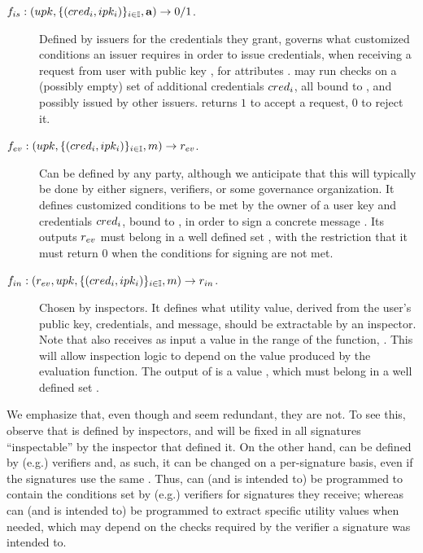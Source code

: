 \begin{description}
\item[$f_{is}: (upk,\lbrace (cred_i,ipk_i) \rbrace_{i \in \mathbb{I}},\mathbf{a})
  \rightarrow 0/1$.] Defined by issuers for the credentials they grant,
  governs what customized conditions an issuer requires in order to issue
  credentials, when receiving a request from user with public key \upk, for
  attributes \attrs. \fissue may run checks on a (possibly empty) set of
  additional credentials $cred_i$, all bound to \upk, and possibly issued
  by other issuers. \fissue returns $1$ to accept a request, $0$ to reject it.  
\item[$f_{ev}: (upk,\lbrace (cred_i,ipk_i) \rbrace_{i \in \mathbb{I}},m)
  \rightarrow r_{ev}$.] Can be defined by
  any party, although we anticipate that this will typically be done by either
  signers, verifiers, or some governance organization. It defines customized
  conditions to be met by the owner of a user key \upk and credentials $cred_i$,
  bound to \upk, in order to sign a concrete message \msg. Its outputs
  $r_{ev}$ must belong in a well defined set \rngfeval, with the
  restriction that it must return $0$ when the conditions for signing are not
  met.
\item[$f_{in}: (r_{ev},upk,\lbrace (cred_i,ipk_i) \rbrace_{i \in \mathbb{I}},
  m) \rightarrow r_{in}$.]
  Chosen by inspectors. It defines what utility value, derived from the user's
  public key, credentials, and message, should be extractable by an inspector.
  Note that \finsp also receives as input a value in the range of the \feval
  function, \rngfeval. This will allow inspection logic to depend on the value
  produced by the evaluation function. The output of \finsp is a value
  \varrngfinsp, which must belong in a well defined set \rngfinsp.
\end{description}

We emphasize that, even though \finsp and \feval seem redundant, they are not.
To see this, observe that \finsp is defined by inspectors, and will be fixed in
all signatures ``inspectable'' by the inspector that defined it. On the other
hand, \feval can be defined by (e.g.) verifiers and, as such, it can be changed
on a per-signature basis, even if the signatures use the same \finsp. Thus,
\feval can (and is intended to) be programmed to contain the conditions set by
(e.g.) verifiers for signatures they receive; whereas \finsp can (and is intended
to) be programmed to extract specific utility values when needed, which may
depend on the checks required by the verifier a signature was intended to.

